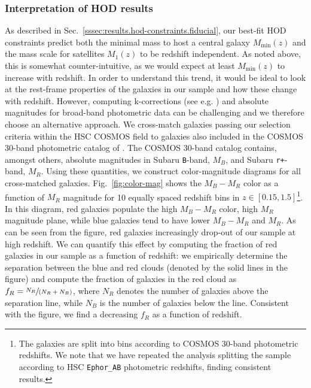 \documentclass[a4paper,11pt]{article}
\begin{document}
    \subsubsection{Interpretation of HOD results}\label{sssec:results.hod-constraints.constraints-interpretation}
      As described in Sec.~\ref{sssec:results.hod-constraints.fiducial}, our best-fit HOD constraints predict both the minimal mass to host a central galaxy $M_{\mathrm{min}}(z)$ and the mass scale for satellites $M_{1}(z)$ to be redshift independent. As noted above, this is somewhat counter-intuitive, as we would expect at least $M_{\mathrm{min}}(z)$ to increase with redshift. In order to understand this trend, it would be ideal to look at the rest-frame properties of the galaxies in our sample and how these change with redshift. However, computing k-corrections (see e.g. \cite{Hogg:2002, Blanton:2007}) and absolute magnitudes for broad-band photometric data can be challenging and we therefore choose an alternative approach. We cross-match galaxies passing our selection criteria within the HSC COSMOS field to galaxies also included in the COSMOS 30-band photometric catalog of \cite{2016ApJS..224...24L}. The COSMOS 30-band catalog contains, amongst others, absolute magnitudes in Subaru \texttt{B}-band, $M_{B}$, and Subaru \texttt{r+}-band, $M_{R}$. Using these quantities, we construct color-magnitude diagrams for all cross-matched galaxies. Fig.~\ref{fig:color-mag} shows the $M_{B}-M_{R}$ color as a function of $M_{R}$ magnitude for 10 equally spaced redshift bins in $z \in [0.15, 1.5]$\footnote{The galaxies are split into bins according to COSMOS 30-band photometric redshifts. We note that we have repeated the analysis splitting the sample according to HSC \texttt{Ephor\_AB} photometric redshifts, finding consistent results.}. In this diagram, red galaxies populate the high $M_{B}-M_{R}$ color, high $M_{R}$ magnitude plane, while blue galaxies tend to have lower $M_{B}-M_{R}$ and $M_{R}$. As can be seen from the figure, red galaxies increasingly drop-out of our sample at high redshift. We can quantify this effect by computing the fraction of red galaxies in our sample as a function of redshift: we empirically determine the separation between the blue and red clouds (denoted by the solid lines in the figure) and compute the fraction of galaxies in the red cloud as $f_{R} = \sfrac{N_{R}}{(N_{R}+N_{B})}$, where $N_{R}$ denotes the number of galaxies above the separation line, while $N_{B}$ is the number of galaxies below the line. Consistent with the figure, we find a decreasing $f_{R}$ as a function of redshift.
      
\end{document}
